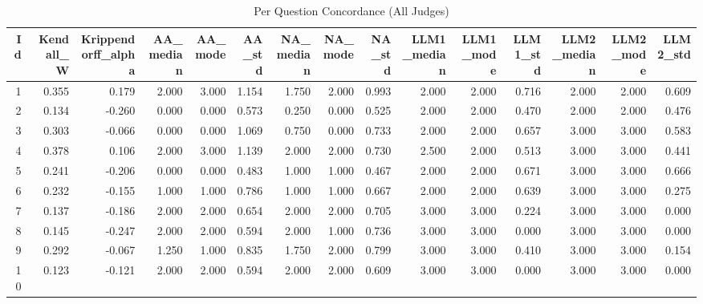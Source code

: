 \begin{table}
\caption{Per Question Concordance (All Judges)}
\label{tab:per_question_concordance_all_judges}
\begin{tabular}{rrrrrrrrrrrrrrr}
\toprule
Id & Kendall_W & Krippendorff_alpha & AA_median & AA_mode & AA_std & NA_median & NA_mode & NA_std & LLM1_median & LLM1_mode & LLM1_std & LLM2_median & LLM2_mode & LLM2_std \\
\midrule
1 & 0.355 & 0.179 & 2.000 & 3.000 & 1.154 & 1.750 & 2.000 & 0.993 & 2.000 & 2.000 & 0.716 & 2.000 & 2.000 & 0.609 \\
2 & 0.134 & -0.260 & 0.000 & 0.000 & 0.573 & 0.250 & 0.000 & 0.525 & 2.000 & 2.000 & 0.470 & 2.000 & 2.000 & 0.476 \\
3 & 0.303 & -0.066 & 0.000 & 0.000 & 1.069 & 0.750 & 0.000 & 0.733 & 2.000 & 2.000 & 0.657 & 3.000 & 3.000 & 0.583 \\
4 & 0.378 & 0.106 & 2.000 & 3.000 & 1.139 & 2.000 & 2.000 & 0.730 & 2.500 & 2.000 & 0.513 & 3.000 & 3.000 & 0.441 \\
5 & 0.241 & -0.206 & 0.000 & 0.000 & 0.483 & 1.000 & 1.000 & 0.467 & 2.000 & 2.000 & 0.671 & 3.000 & 3.000 & 0.666 \\
6 & 0.232 & -0.155 & 1.000 & 1.000 & 0.786 & 1.000 & 1.000 & 0.667 & 2.000 & 2.000 & 0.639 & 3.000 & 3.000 & 0.275 \\
7 & 0.137 & -0.186 & 2.000 & 2.000 & 0.654 & 2.000 & 2.000 & 0.705 & 3.000 & 3.000 & 0.224 & 3.000 & 3.000 & 0.000 \\
8 & 0.145 & -0.247 & 2.000 & 2.000 & 0.594 & 2.000 & 1.000 & 0.736 & 3.000 & 3.000 & 0.000 & 3.000 & 3.000 & 0.000 \\
9 & 0.292 & -0.067 & 1.250 & 1.000 & 0.835 & 1.750 & 2.000 & 0.799 & 3.000 & 3.000 & 0.410 & 3.000 & 3.000 & 0.154 \\
10 & 0.123 & -0.121 & 2.000 & 2.000 & 0.594 & 2.000 & 2.000 & 0.609 & 3.000 & 3.000 & 0.000 & 3.000 & 3.000 & 0.000 \\
\bottomrule
\end{tabular}
\end{table}
